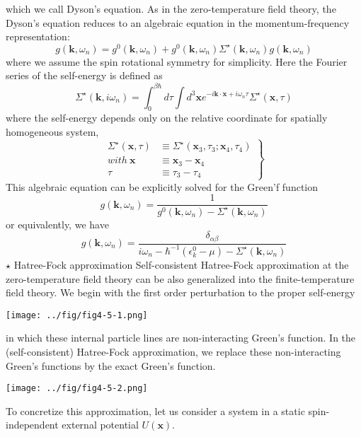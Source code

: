 which we call Dyson's equation.
As in the zero-temperature field theory, the Dyson's equation reduces to an algebraic equation in the momentum-frequency representation:
\begin{equation}
g(\mathbf{k},\omega_n)=g^0(\mathbf{k},\omega_n)+g^0(\mathbf{k},\omega_n)\Sigma^\star(\mathbf{k},\omega_n)g(\mathbf{k},\omega_n)
\end{equation}
where we assume the spin rotational symmetry for simplicity.
Here the Fourier series of the self-energy is defined as
\begin{equation}
\Sigma^\star(\mathbf{k},i\omega_n)=\int_0^{\beta\hbar} d\tau \int d^3\mathbf{x} e^{-i\mathbf{k}\cdot\mathbf{x}+i\omega_n\tau}\Sigma^\star(\mathbf{x},\tau)
\end{equation}
where the self-energy depends only on the relative coordinate for spatially homogeneous system,
\[
\left.
\begin{aligned}
\Sigma^\star(\mathbf{x},\tau)&\equiv\Sigma^\star(\mathbf{x}_3,\tau_3;\mathbf{x}_4,\tau_4)\\
with\ \mathbf{x}&\equiv\mathbf{x}_3-\mathbf{x}_4\\
\tau&\equiv\tau_3-\tau_4
\end{aligned}
\right\}\tag{$4.5.4^\prime$}
\]
This algebraic equation can be explicitly solved for the Green'f function
\begin{equation}
g(\mathbf{k},\omega_n)=\frac{1}{g^0(\mathbf{k},\omega_n)-\Sigma^\star(\mathbf{k},\omega_n)}
\end{equation}
or equivalently, we have
\[
g(\mathbf{k},\omega_n)=\frac{\delta_{\alpha\beta}}{i\omega_n-\hbar^{-1}(\epsilon_k^0-\mu)-\Sigma^\star(\mathbf{k},\omega_n)}\tag{$4.5.5^\prime$}
\]
$\star$ Hatree-Fock approximation
Self-consistent Hatree-Fock approximation at the zero-temperature field theory can be also generalized into the finite-temperature field theory.
We begin with the first order perturbation to the proper self-energy
\begin{center}
\texttt{[image: ../fig/fig4-5-1.png]}
\end{center}
in which these internal particle lines are non-interacting Green's function.
In the (self-consistent) Hatree-Fock approximation, we replace these non-interacting Green's functions by the exact Green's function.
\begin{center}
\texttt{[image: ../fig/fig4-5-2.png]}
\end{center}
To concretize this approximation, let us consider a system in a static spin-independent external potential $U(\mathbf{x})$.
